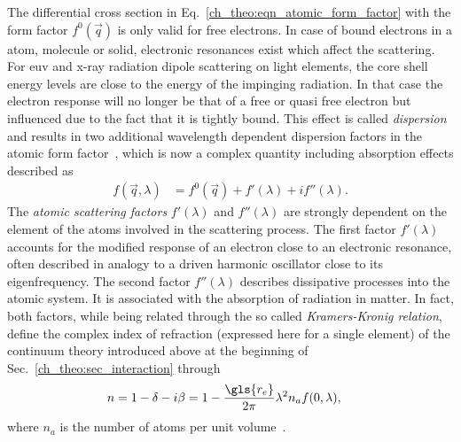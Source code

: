 The differential cross section in Eq.~\eqref{ch_theo:eqn_atomic_form_factor} with the form factor $f^{0}(\vec{q})$ is only valid for free electrons. In case of bound electrons in a atom, molecule or solid, electronic resonances exist which affect the scattering. For \gls{euv} and x-ray radiation dipole scattering on light elements, the core shell energy levels are close to the energy of the impinging radiation. In that case the electron response will no longer be that of a free or quasi free electron but influenced due to the fact that it is tightly bound. This effect is called \emph{dispersion} and results in two additional wavelength dependent dispersion factors in the atomic form factor~\cite{als-nielsen_x-rays_2011, daillant_x-ray_2009}, which is now a complex quantity including absorption effects described as
\begin{align}
 f(\vec{q}, \lambda) &= f^0(\vec{q}) + f'(\lambda) + i f''(\lambda) \text{.} \label{ch_theo:eqn_dispersion_correction}
\end{align}
The \emph{atomic scattering factors} $f'(\lambda)$ and $f''(\lambda)$ are strongly dependent on the element of the atoms involved in the scattering process. The first factor $f'(\lambda)$ accounts for the modified response of an electron close to an electronic resonance, often described in analogy to a driven harmonic oscillator close to its eigenfrequency. The second factor $f''(\lambda)$ describes dissipative processes into the atomic system. It is associated with the absorption of radiation in matter. In fact, both factors, while being related through the so called \emph{Kramers-Kronig relation}, define the complex index of refraction (expressed here for a single element) of the continuum theory introduced above at the beginning of Sec.~\ref{ch_theo:sec_interaction} through
\begin{align}
n &= 1 - \delta - i \beta = 1 - \frac{\gls{r_e}}{2 \pi} \lambda^2 n_a f(0, \lambda) \text{,}
\end{align}
where $n_a$ is the number of atoms per unit volume~\cite{thompson_x-ray_2001}.

